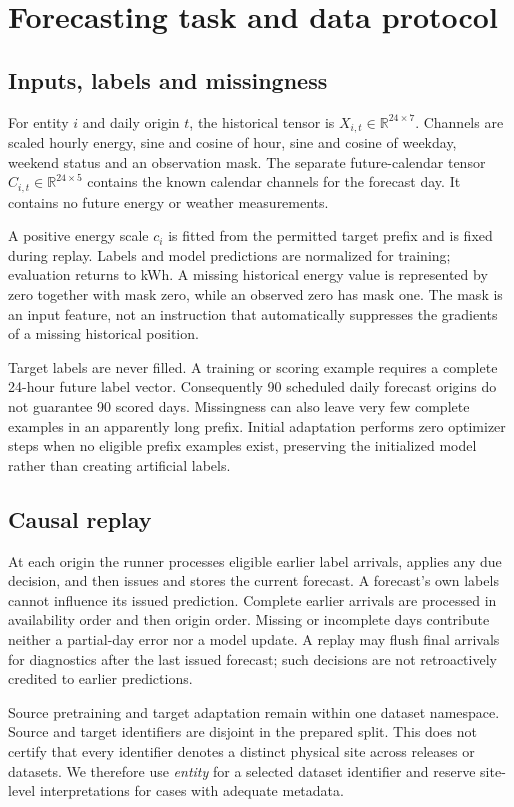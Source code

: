 \documentclass[pdflatex,iicol,sn-mathphys-num]{sn-jnl}
\begin{document}
\section{Forecasting task and data protocol}
\subsection{Inputs, labels and missingness}
For entity $i$ and daily origin $t$, the historical tensor is $X_{i,t}\in\mathbb R^{24\times7}$. Channels are scaled hourly energy, sine and cosine of hour, sine and cosine of weekday, weekend status and an observation mask. The separate future-calendar tensor $C_{i,t}\in\mathbb R^{24\times5}$ contains the known calendar channels for the forecast day. It contains no future energy or weather measurements.

A positive energy scale $c_i$ is fitted from the permitted target prefix and is fixed during replay. Labels and model predictions are normalized for training; evaluation returns to kWh. A missing historical energy value is represented by zero together with mask zero, while an observed zero has mask one. The mask is an input feature, not an instruction that automatically suppresses the gradients of a missing historical position.

Target labels are never filled. A training or scoring example requires a complete 24-hour future label vector. Consequently 90 scheduled daily forecast origins do not guarantee 90 scored days. Missingness can also leave very few complete examples in an apparently long prefix. Initial adaptation performs zero optimizer steps when no eligible prefix examples exist, preserving the initialized model rather than creating artificial labels.

\subsection{Causal replay}
At each origin the runner processes eligible earlier label arrivals, applies any due decision, and then issues and stores the current forecast. A forecast's own labels cannot influence its issued prediction. Complete earlier arrivals are processed in availability order and then origin order. Missing or incomplete days contribute neither a partial-day error nor a model update. A replay may flush final arrivals for diagnostics after the last issued forecast; such decisions are not retroactively credited to earlier predictions.

Source pretraining and target adaptation remain within one dataset namespace. Source and target identifiers are disjoint in the prepared split. This does not certify that every identifier denotes a distinct physical site across releases or datasets. We therefore use \emph{entity} for a selected dataset identifier and reserve site-level interpretations for cases with adequate metadata.
\end{document}
